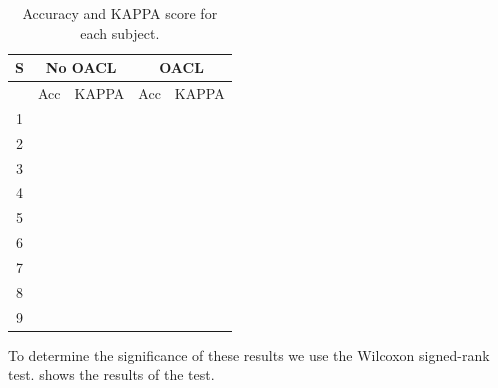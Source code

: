\begin{table}[H]
	\centering
	\caption{Accuracy and KAPPA score for each subject.}
	\label{fig:results}
	\begin{tabular}{@{}c|cc|cc@{}}
		\toprule
		\textbf{S}             & \multicolumn{2}{c|}{\textbf{No OACL}} & \multicolumn{2}{c}{\textbf{OACL}} \\ \midrule
		\multicolumn{1}{c|}{}  & Acc                   & KAPPA             & Acc                   & KAPPA             \\ \midrule
		1 &                       &                   &                       &                   \\
		2 &                       &                   &                       &                   \\
		3 &                       &                   &                       &                   \\
		4 &                       &                   &                       &                   \\
		5 & \textbf{}             &                   & \textbf{}             &                   \\
		6 &                       &                   &                       &                   \\
		7 &                       &                   &                       &                   \\
		8 &                       &                   &                       &                   \\
		9 &                       &                   &                       &                   \\ \bottomrule
	\end{tabular}
\end{table}

To determine the significance of these results we use the Wilcoxon signed-rank test.  shows the results of the test.

